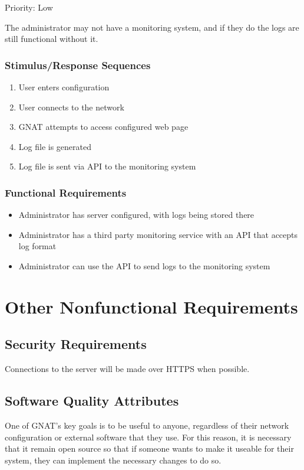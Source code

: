 \documentclass{scrreprt}
\begin{document}
Priority: Low

The administrator may not have a monitoring system, and if they do the logs are still functional without it.

\subsection{Stimulus/Response Sequences}

\begin{enumerate}
\item User enters configuration
\item User connects to the network
\item GNAT attempts to access configured web page
\item Log file is generated
\item Log file is sent via API to the monitoring system
\end{enumerate}

\subsection{Functional Requirements}

\begin{itemize}
\item Administrator has server configured, with logs being stored there
\item Administrator has a third party monitoring service with an API that accepts log format
\item Administrator can use the API to send logs to the monitoring system
\end{itemize}

\chapter{Other Nonfunctional Requirements}

\section{Security Requirements}

Connections to the server will be made over HTTPS when possible.

\section{Software Quality Attributes}
One of GNAT's key goals is to be useful to anyone, regardless of their network configuration or external software that they use.  For this reason, it is necessary that it remain open source so that if someone wants to make it useable for their system, they can implement the necessary changes to do so.
\end{document}
